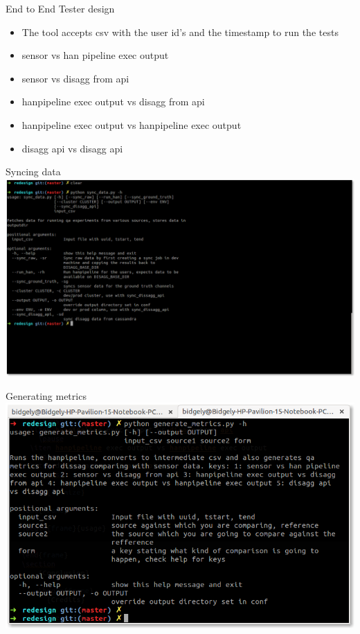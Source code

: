 \documentclass[xcolor=svgnames,handout]{beamer}
\begin{document}
    \begin{frame}{End to End Tester design}
      \begin{itemize}
      \item The tool accepts csv with the user id's and the timestamp
        to run the tests
        \pause
      \item sensor vs  han pipeline exec output
        \pause
      \item sensor vs disagg from api
        \pause
      \item hanpipeline exec output vs disagg from api
        \pause
      \item hanpipeline exec output vs hanpipeline exec output
        \pause
      \item disagg api vs disagg api
        \pause

      \end{itemize}
      
    \end{frame}

    \begin{frame}{Syncing data}
       \includegraphics[height=0.8\textheight]{sync}
    \end{frame}
    
    
    \begin{frame}{Generating metrics}
      \includegraphics[height=0.8\textheight]{usage}
    \end{frame}
\end{document}
